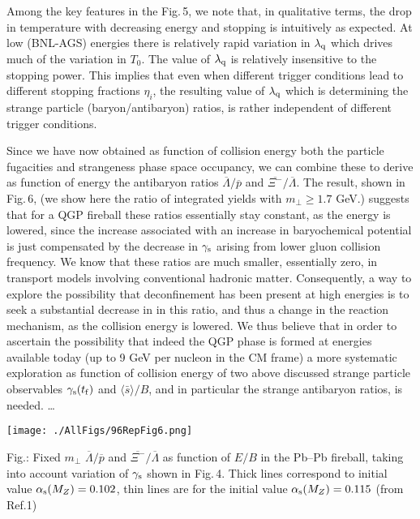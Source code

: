 \begin{mdframed}[linecolor=gray,roundcorner=12pt,backgroundcolor=Dandelion!15,linewidth=1pt,leftmargin=0cm,rightmargin=0cm,topline=true,bottomline=true,skipabove=12pt]
Among the key features in the  Fig.\,5, we note that, in qualitative terms, the drop in temperature with decreasing energy and stopping is intuitively as expected. At low (BNL-AGS) energies there is relatively rapid variation in $\lambda_{\rm q}$ which drives much of the variation in $T_0$. The value of $\lambda_{\rm q}$ is relatively insensitive to the stopping power.  This implies that even when different trigger conditions lead to different stopping fractions $\eta_i$, the resulting value of $\lambda_{\rm q}$ which is determining  the strange particle (baryon/antibaryon) ratios, is rather independent of different trigger conditions. 
 
Since we have now obtained as function of collision energy both the particle fugacities and strangeness phase space occupancy, we can combine these to derive as function of energy the  antibaryon ratios $\overline{\Lambda}/\overline{p}$ and $\overline{\Xi^-}/\overline{\Lambda}$.  The result, shown in Fig.\,6, (we show here the ratio of integrated yields with $m_\bot\ge 1.7$ GeV.) suggests that for a QGP fireball these ratios essentially stay constant, as the energy is lowered, since the increase associated with an increase in baryochemical potential is just compensated by the decrease in $\gamma_{\rm s}$ arising from lower gluon  collision frequency. We know that these ratios are much smaller, essentially zero,  in transport models involving conventional hadronic matter. Consequently, a way to explore the possibility that deconfinement has been present at high energies is  to seek a  substantial decrease in in this ratio, and thus a change in the reaction mechanism, as the collision energy is lowered. We thus believe that in order to ascertain the possibility that indeed the QGP phase is formed at energies available today (up to 9 GeV per nucleon in the CM frame) a more systematic exploration as function of collision energy of two above discussed strange particle observables $\gamma_{\rm s}(t_{\rm f})$ and $\langle \bar s \rangle /B$, and in particular the strange antibaryon ratios, is needed. \ldots

\centerline{
\texttt{[image: ./AllFigs/96RepFig6.png]}
} %
\noindent Fig.: Fixed $m_\bot$ $\overline{\Lambda}/\overline{p}$ and $\overline{\Xi^-}/\overline{\Lambda}$ as function of $E/B$ in the Pb--Pb fireball, taking into account variation of $\gamma_{\rm s}$ shown in Fig.\,4. Thick lines correspond to initial value $\alpha_{\rm s}(M_Z)=0.102$, thin lines are for the initial value $\alpha_{\rm s}(M_Z)=0.115$ (from Ref.1)\\ %


\end{mdframed}
